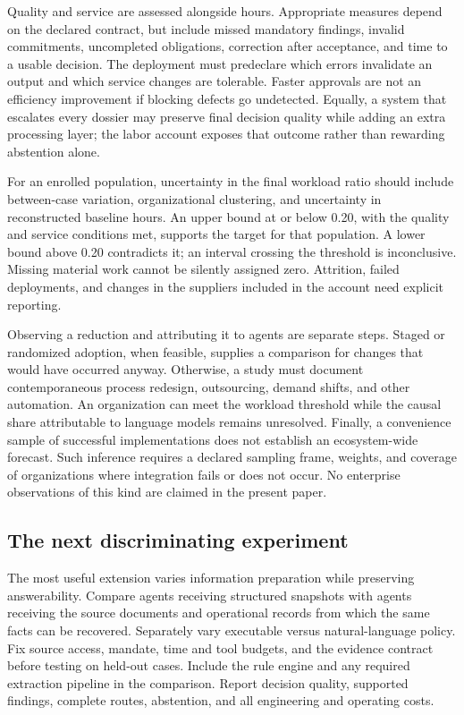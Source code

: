 Quality and service are assessed alongside hours. Appropriate measures depend on the declared
contract, but include missed mandatory findings, invalid commitments, uncompleted obligations,
correction after acceptance, and time to a usable decision. The deployment must predeclare
which errors invalidate an output and which service changes are tolerable. Faster approvals
are not an efficiency improvement if blocking defects go undetected. Equally, a system that
escalates every dossier may preserve final decision quality while adding an extra processing
layer; the labor account exposes that outcome rather than rewarding abstention alone.

For an enrolled population, uncertainty in the final workload ratio should include between-case
variation, organizational clustering, and uncertainty in reconstructed baseline hours. An
upper bound at or below 0.20, with the quality and service conditions met, supports the target
for that population. A lower bound above 0.20 contradicts it; an interval crossing the threshold
is inconclusive. Missing material work cannot be silently assigned zero. Attrition, failed
deployments, and changes in the suppliers included in the account need explicit reporting.

Observing a reduction and attributing it to agents are separate steps. Staged or randomized
adoption, when feasible, supplies a comparison for changes that would have occurred anyway.
Otherwise, a study must document contemporaneous process redesign, outsourcing, demand shifts,
and other automation. An organization can meet the workload threshold while the causal share
attributable to language models remains unresolved. Finally, a convenience sample of successful
implementations does not establish an ecosystem-wide forecast. Such inference requires a
declared sampling frame, weights, and coverage of organizations where integration fails or
does not occur. No enterprise observations of this kind are claimed in the present paper.

\subsection{The next discriminating experiment}

The most useful extension varies information preparation while preserving answerability.
Compare agents receiving structured snapshots with agents receiving the source documents and
operational records from which the same facts can be recovered. Separately vary executable
versus natural-language policy. Fix source access, mandate, time and tool budgets, and the
evidence contract before testing on held-out cases. Include the rule engine and any required
extraction pipeline in the comparison. Report decision quality, supported findings, complete
routes, abstention, and all engineering and operating costs.

